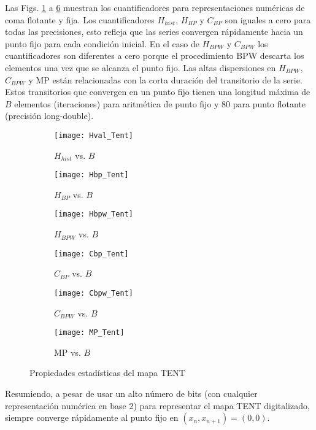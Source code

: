 Las Figs. \ref{fig:Hval_Tent} a \ref{fig:MP_Tent} muestran los cuantificadores para representaciones numéricas de coma flotante y fija.
Los cuantificadores $H_{hist}$, $H_{BP}$ y $C_{BP}$ son iguales a cero para todas las precisiones, esto refleja que las series convergen rápidamente hacia un punto fijo para cada condición inicial.
En el caso de $H_{BPW}$ y $C_{BPW}$ los cuantificadores son diferentes a cero porque el procedimiento BPW descarta los elementos una vez que se alcanza el punto fijo.
Las altas dispersiones en $H_{BPW}$, $C_{BPW}$ y MP están relacionadas con la corta duración del transitorio de la serie.
Estos transitorios que convergen en un punto fijo tienen una longitud máxima de $B$ elementos (iteraciones) para aritmética de punto fijo y $80$ para punto flotante (precisión long-double).
%
\begin{figure}[htpb]
	\centering
	\begin{subfigure}[b]{0.49\textwidth}
		\texttt{[image: Hval\_Tent]}
		\caption{$H_{hist}$ vs. $B$}
		\label{fig:Hval_Tent}
	\end{subfigure}
	\begin{subfigure}[b]{0.49\textwidth}
		\texttt{[image: Hbp\_Tent]}
		\caption{$H_{BP}$ vs. $B$}
		\label{fig:Hbp_Tent}
	\end{subfigure}
	\begin{subfigure}[b]{0.49\textwidth}
		\texttt{[image: Hbpw\_Tent]}
		\caption{$H_{BPW}$ vs. $B$}
		\label{fig:Hbpw_Tent}
	\end{subfigure}
	\begin{subfigure}[b]{0.49\textwidth}
		\texttt{[image: Cbp\_Tent]}
		\caption{$C_{BP}$ vs. $B$}
		\label{fig:Cbp_Tent}
	\end{subfigure}
	\begin{subfigure}[b]{0.49\textwidth}
		\texttt{[image: Cbpw\_Tent]}
		\caption{$C_{BPW}$ vs. $B$}
		\label{fig:Cbpw_Tent}
	\end{subfigure}
	\begin{subfigure}[b]{0.49\textwidth}
		\texttt{[image: MP\_Tent]}
		\caption{MP vs. $B$}
		\label{fig:MP_Tent}
	\end{subfigure}
	\caption{Propiedades estadísticas del mapa TENT}
	\label{fig:TENT_QuantiB}
\end{figure}

Resumiendo, a pesar de usar un alto número de bits (con cualquier representación numérica en base 2) para representar el mapa TENT digitalizado, siempre converge rápidamente al punto fijo en $(x_n, x_{n+1}) = (0, 0)$.